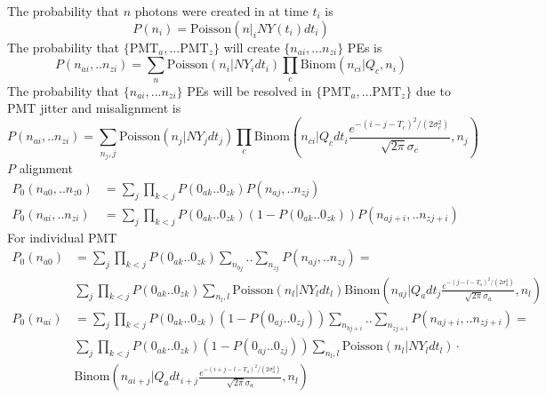 \documentclass[12pt]{report}
\begin{document}
The probability that $n$ photons were created in at time $t_i$ is
\begin{equation}
P(n_i)=\text{Poisson}(n|_iNY(t_i)dt_i)
\end{equation}
The probability that $\{\text{PMT}_a,...\text{PMT}_z\}$ will create $\{n_{ai},...n_{zi}\}$ PEs is
\begin{equation}
P(n_{ai},..n_{zi})=\sum_n\text{Poisson}(n_i|NY_idt_i)\prod_c\text{Binom}(n_{ci}|Q_c,n_i)
\end{equation}
The probability that $\{n_{ai},...n_{zi}\}$ PEs will be resolved in $\{\text{PMT}_a,...\text{PMT}_z\}$ due to PMT jitter and misalignment is
\begin{equation}
P(n_{ai},..n_{zi})=\sum_{n_j,j}\text{Poisson}(n_j|NY_jdt_j)\prod_c\text{Binom}\left(n_{ci}|Q_cdt_i\frac{e^{-(i-j-T_c)^2/(2\sigma_c^2)}}{\sqrt{2\pi}\sigma_c},n_j\right)
\end{equation}
$P$ alignment
\begin{equation}
\begin{split}
P_0(n_{a0},..n_{z0})&=\sum_j\prod_{k<j}P(0_{ak}..0_{zk})P(n_{aj},..n_{zj})\\
P_0(n_{ai},..n_{zi})&=\sum_j\prod_{k<j}P(0_{ak}..0_{zk})\left(1-P(0_{ak}..0_{zk})\right)P(n_{aj+i},..n_{zj+i})
\end{split}
\end{equation} 
For individual PMT
\begin{equation}
\begin{split}
P_0(n_{a0})&=\sum_j\prod_{k<j}P(0_{ak}..0_{zk})\sum_{n_{bj}}..\sum_{n_{zj}}P(n_{aj},..n_{zj})=\\
&\sum_j\prod_{k<j}P(0_{ak}..0_{zk})\sum_{n_l,l}\text{Poisson}(n_l|NY_ldt_l)\text{Binom}\left(n_{aj}|Q_adt_j\frac{e^{-(j-l-T_a)^2/(2\sigma_a^2)}}{\sqrt{2\pi}\sigma_a},n_l\right)\\
P_0(n_{ai})&=\sum_j\prod_{k<j}P(0_{ak}..0_{zk})\left(1-P(0_{aj}..0_{zj})\right)\sum_{n_{bj+i}}..\sum_{n_{zj+i}}P(n_{aj+i},..n_{zj+i})=\\
&\sum_j\prod_{k<j}P(0_{ak}..0_{zk})\left(1-P(0_{aj}..0_{zj})\right)\sum_{n_l,l}\text{Poisson}(n_l|NY_ldt_l)\cdot\\
&\text{Binom}\left(n_{ai+j}|Q_adt_{i+j}\frac{e^{-(i+j-l-T_a)^2/(2\sigma_a^2)}}{\sqrt{2\pi}\sigma_a},n_l\right)
\end{split}
\end{equation}
\end{document}
